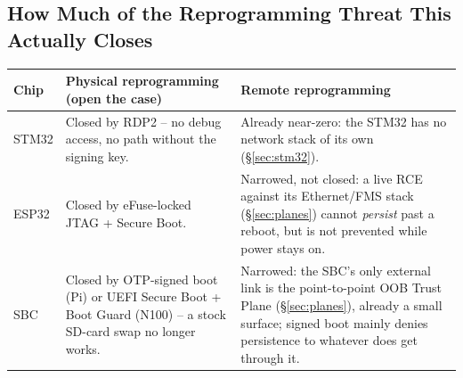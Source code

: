 \documentclass[11pt,a4paper]{article}
\begin{document}
\subsection{How Much of the Reprogramming Threat This Actually Closes}
\label{sec:reprogram-analysis}

\begin{center}
\renewcommand{\arraystretch}{1.5}
\small
\begin{tabular}{@{}p{2.6cm}p{6.7cm}p{4.3cm}@{}}
\toprule
\textbf{Chip} & \textbf{Physical reprogramming (open the case)} & \textbf{Remote reprogramming} \\
\midrule
STM32 & Closed by RDP2 -- no debug access, no path without the signing
key. & Already near-zero: the STM32 has no network stack of its own
(\S\ref{sec:stm32}). \\
ESP32 & Closed by eFuse-locked JTAG + Secure Boot. & Narrowed, not
closed: a live RCE against its Ethernet/FMS stack (\S\ref{sec:planes})
cannot \emph{persist} past a reboot, but is not prevented while power
stays on. \\
SBC & Closed by OTP-signed boot (Pi) or UEFI Secure Boot + Boot Guard
(N100) -- a stock SD-card swap no longer works. & Narrowed: the SBC's
only external link is the point-to-point OOB Trust Plane
(\S\ref{sec:planes}), already a small surface; signed boot mainly
denies persistence to whatever does get through it. \\
\bottomrule
\end{tabular}
\end{center}
\end{document}
